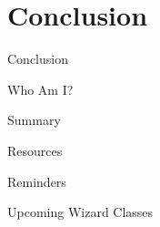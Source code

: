 \documentclass{beamer}
\theoremstyle{example}
\begin{document}
\part{Conclusion}
\begin{frame}{Conclusion}
    \begin{block}{Who Am I?}
    \end{block}
    \begin{block}{Summary}
    \end{block}
    \begin{block}{Resources}
    \end{block}
    \begin{block}{Reminders}
    \end{block}
    \begin{block}{Upcoming Wizard Classes}
    \end{block}
\end{frame}

\end{document}
